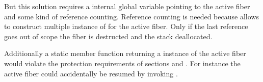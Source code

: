 But this solution requires a internal global variable pointing to the active
fiber and some kind of reference counting. Reference counting is needed because
 allows to construct multiple instance of \fiber for the
active fiber. Only if the last reference goes out of scope the fiber is
destructed and the stack deallocated.

Additionally a static member function returning a instance of the active fiber
would violate the protection requirements of sections  and
. For instance the active fiber could accidentally be
resumed by invoking \resume.

